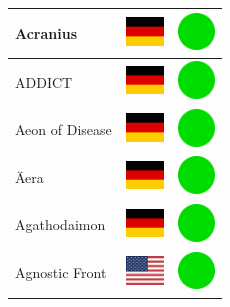 \documentclass[12pt, a4paper, twoside]{report}
\begin{document}
\begin{center}
\begin{longtable}{|p{5cm}|p{2cm}|p{2cm}|}
Acranius & \includegraphics[width=1cm]{4x3/de} & \includegraphics[width=1cm]{likes/y} \\ \hline
ADDICT & \includegraphics[width=1cm]{4x3/de} & \includegraphics[width=1cm]{likes/y} \\ \hline
Aeon of Disease & \includegraphics[width=1cm]{4x3/de} & \includegraphics[width=1cm]{likes/y} \\ \hline
Äera & \includegraphics[width=1cm]{4x3/de} & \includegraphics[width=1cm]{likes/y} \\ \hline
Agathodaimon & \includegraphics[width=1cm]{4x3/de} & \includegraphics[width=1cm]{likes/y} \\ \hline
Agnostic Front & \includegraphics[width=1cm]{4x3/us} & \includegraphics[width=1cm]{likes/y} \\ \hline

\end{longtable}
\end{center}
\end{document}
